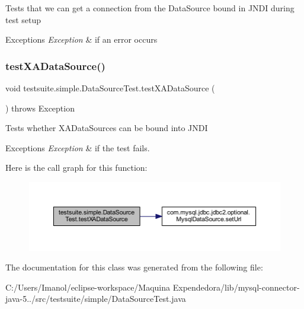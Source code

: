 Tests that we can get a connection from the Data\+Source bound in J\+N\+DI during test setup


\begin{DoxyExceptions}{Exceptions}
{\em Exception} & if an error occurs \\
\hline
\end{DoxyExceptions}
\mbox{\label{classtestsuite_1_1simple_1_1_data_source_test_aeffb3e326e27d83bfc0da82269ef479b}} 
\subsubsection{\texorpdfstring{test\+X\+A\+Data\+Source()}{testXADataSource()}}
{\footnotesize\ttfamily void testsuite.\+simple.\+Data\+Source\+Test.\+test\+X\+A\+Data\+Source (\begin{DoxyParamCaption}{ }\end{DoxyParamCaption}) throws Exception}

Tests whether X\+A\+Data\+Sources can be bound into J\+N\+DI


\begin{DoxyExceptions}{Exceptions}
{\em Exception} & if the test fails. \\
\hline
\end{DoxyExceptions}
Here is the call graph for this function\+:
\nopagebreak
\begin{figure}[H]
\begin{center}
\leavevmode
\includegraphics[width=350pt]{classtestsuite_1_1simple_1_1_data_source_test_aeffb3e326e27d83bfc0da82269ef479b_cgraph}
\end{center}
\end{figure}


The documentation for this class was generated from the following file\+:\begin{DoxyCompactItemize}
\item 
C\+:/\+Users/\+Imanol/eclipse-\/workspace/\+Maquina Expendedora/lib/mysql-\/connector-\/java-\/5../src/testsuite/simple/Data\+Source\+Test.\+java\end{DoxyCompactItemize}
